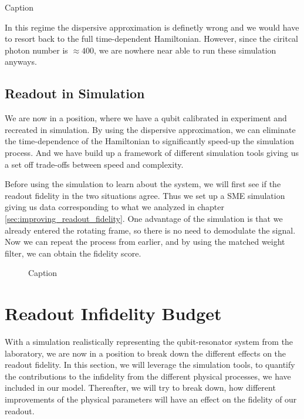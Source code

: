 \begin{marginfigure}
    \centering
    \caption{Caption}
    \label{fig:experiment_punchout}
\end{marginfigure}

In this regime the dispersive approximation is definetly wrong and we would have to resort back to the full time-dependent Hamiltonian. However, since the ciritcal photon number is $\approx 400$, we are nowhere near able to run these simulation anyways. 

\section{Readout in Simulation}
We are now in a position, where we have a qubit calibrated in experiment and recreated in simulation. By using the dispersive approximation, we can eliminate the time-dependence of the Hamiltonian to significantly speed-up the simulation process. And we have build up a framework of different simulation tools giving us a set off trade-offs between speed and complexity. 

Before using the simulation to learn about the system, we will first see if the readout fidelity in the two situations agree. Thus we set up a SME simulation giving us data corresponding to what we analyzed in chapter \ref{sec:improving_readout_fidelity}. One advantage of the simulation is that we already entered the rotating frame, so there is no need to demodulate the signal. Now we can repeat the process from earlier, and by using the matched weight filter, we can obtain the fidelity score.

\begin{figure}
    \centering
    \caption{Caption}
    \label{fig:enter-label}
\end{figure}



\chapter{Readout Infidelity Budget}
With a simulation realistically representing the qubit-resonator system from the laboratory, we are now in a position to break down the different effects on the readout fidelity. In this section, we will leverage the simulation tools, to quantify the contributions to the infidelity from the different physical processes, we have included in our model. Thereafter, we will try to break down, how different improvements of the physical parameters will have an effect on the fidelity of our readout. 

